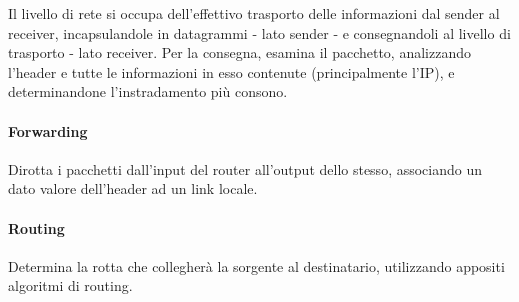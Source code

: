 Il livello di rete si occupa dell'effettivo trasporto delle informazioni dal sender al receiver, incapsulandole in datagrammi - lato sender - e consegnandoli al livello di trasporto - lato receiver.
Per la consegna, esamina il pacchetto, analizzando l'header e tutte le informazioni in esso contenute (principalmente l'IP), e determinandone l'instradamento più consono.

\paragraph{Forwarding}
Dirotta i pacchetti dall'input del router all'output dello stesso, associando un dato valore dell'header ad un link locale.
\paragraph{Routing}
Determina la rotta che collegherà la sorgente al destinatario, utilizzando appositi algoritmi di routing.\\\\

